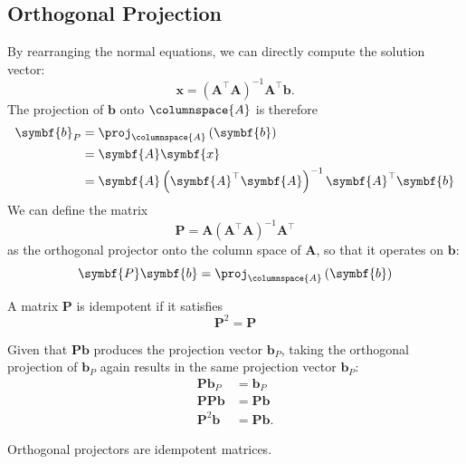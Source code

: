 \documentclass{article}
\begin{document}
\subsection{Orthogonal Projection}
By rearranging the normal equations, we can directly compute the
solution vector:
\begin{equation*}
    \symbf{x} = \left( \symbf{A}^\top \symbf{A} \right)^{-1} \symbf{A}^\top \symbf{b}.
\end{equation*}
The projection of \(\symbf{b}\) onto \(\columnspace{A}\) is therefore
\begin{align*}
    \symbf{b}_P & = \proj_{\columnspace{A}} \left( \symbf{b} \right)                                \\
                & = \symbf{A} \symbf{x}                                                             \\
                & = \symbf{A} \left( \symbf{A}^\top \symbf{A} \right)^{-1} \symbf{A}^\top \symbf{b}
\end{align*}
We can define the matrix
\begin{equation*}
    \symbf{P} = \symbf{A} \left( \symbf{A}^\top \symbf{A} \right)^{-1} \symbf{A}^\top
\end{equation*}
as the orthogonal projector onto the column space of \(\symbf{A}\), so that it operates on \(\symbf{b}\):
\begin{equation*}
    \symbf{P} \symbf{b} = \proj_{\columnspace{A}} \left( \symbf{b} \right)
\end{equation*}
\begin{definition}[Idempotent]
    A matrix \(\symbf{P}\) is idempotent if it satisfies
    \begin{equation*}
        \symbf{P}^2 = \symbf{P}
    \end{equation*}
\end{definition}
Given that \(\symbf{P}\symbf{b}\) produces the projection vector \(\symbf{b}_P\),
taking the orthogonal projection of \(\symbf{b}_P\) again results in the
same projection vector \(\symbf{b}_P\):
\begin{align*}
    \symbf{P} \symbf{b}_P        & = \symbf{b}_P         \\
    \symbf{P}\symbf{P} \symbf{b} & = \symbf{P} \symbf{b} \\
    \symbf{P}^2 \symbf{b}        & = \symbf{P} \symbf{b}.
\end{align*}
\begin{theorem}
    Orthogonal projectors are idempotent matrices.
\end{theorem}
\end{document}
